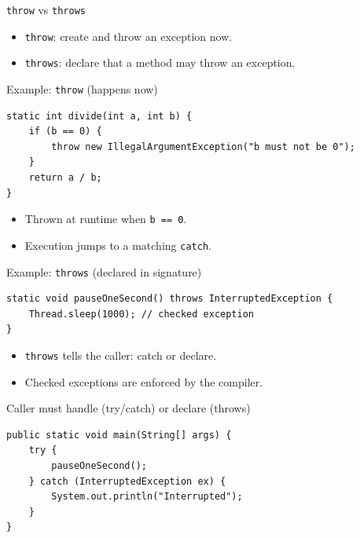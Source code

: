 \documentclass{beamer}
\begin{document}
\begin{frame}{\texttt{throw} vs \texttt{throws}}
  \begin{itemize}[<+->]
    \item \texttt{throw}: create and throw an exception now.
    \item \texttt{throws}: declare that a method may throw an exception.
  \end{itemize}
  \slidesources{\OOPSUnitIIISources}
\end{frame}

\begin{frame}[fragile]{Example: \texttt{throw} (happens now)}
\begin{lstlisting}
static int divide(int a, int b) {
    if (b == 0) {
        throw new IllegalArgumentException("b must not be 0");
    }
    return a / b;
}
\end{lstlisting}
  \begin{itemize}[<+->]
    \item Thrown at runtime when \texttt{b == 0}.
    \item Execution jumps to a matching \texttt{catch}.
  \end{itemize}
  \slidesources{\OOPSUnitIIISources}
\end{frame}

\begin{frame}[fragile]{Example: \texttt{throws} (declared in signature)}
\begin{lstlisting}
static void pauseOneSecond() throws InterruptedException {
    Thread.sleep(1000); // checked exception
}
\end{lstlisting}
  \begin{itemize}[<+->]
    \item \texttt{throws} tells the caller: catch or declare.
    \item Checked exceptions are enforced by the compiler.
  \end{itemize}
  \slidesources{\OOPSUnitIIISources}
\end{frame}

\begin{frame}[fragile]{Caller must handle (try/catch) or declare (throws)}
\begin{lstlisting}
public static void main(String[] args) {
    try {
        pauseOneSecond();
    } catch (InterruptedException ex) {
        System.out.println("Interrupted");
    }
}
\end{lstlisting}
  \slidesources{\OOPSUnitIIISources}
\end{frame}
\end{document}
